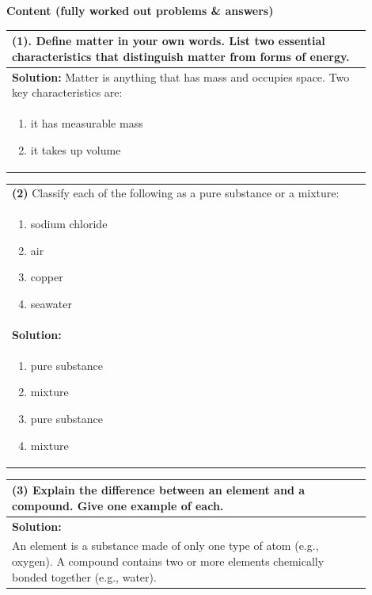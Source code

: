 \documentclass{article}
\begin{document}
\noindent
{\large \textbf{Content (fully worked out problems \& answers)}} \\[0.2em]
\noindent
\begin{tabular}{|p{0.9\linewidth}|}
\hline
\vspace{0.2cm}
\textbf{(1)}. Define matter in your own words. List two essential characteristics that distinguish matter from forms of energy. \\
\hline
\textbf{Solution:} Matter is anything that has mass and occupies space. Two key characteristics are: \\ 
\begin{enumerate}
    \item it has measurable mass
    \item it takes up volume
\end{enumerate}
\\
\hline
\end{tabular}
\newpage
\begin{tabular}{|p{0.9\linewidth}|}
\hline
\vspace{0.2cm}

\textbf{(2)} Classify each of the following as a pure substance or a mixture: \\
\begin{enumerate}
    \item sodium chloride
    \item air
    \item copper
    \item seawater 
\end{enumerate}\\
\hline
\textbf{Solution:} \\
\begin{enumerate}
    \item pure substance
    \item mixture
    \item pure substance
    \item mixture
\end{enumerate}
\\
\hline
\end{tabular}
\newpage
\begin{tabular}{|p{0.9\linewidth}|}
\hline

\vspace{0.2cm}

\textbf{(3)} Explain the difference between an element and a compound. Give one example of each. \\
\hline

\textbf{Solution:} \\
An element is a substance made of only one type of atom (e.g., oxygen). A compound contains two or more elements chemically bonded together (e.g., water). \\
\hline
\end{tabular}
\end{document}
